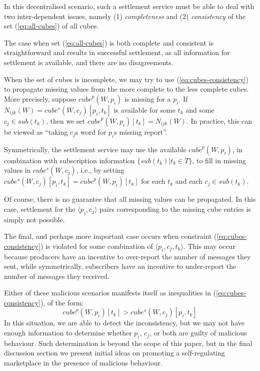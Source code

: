 \documentclass[chi_draft]{sigchi}
\begin{document}
In this decentralised scenario, such a settlement service must be able to deal with two inter-dependent issues, namely (1) \textit{completeness} and (2) \textit{consistency} of the set (\ref{eq:all-cubes}) of all cubes.

The case when set (\ref{eq:all-cubes}) is both complete and consistent is straightforward and results in successful settlement, as all information for settlement is available, and there are no disagreements.

When the set of cubes is incomplete, we may try to use (\ref{eq:cubes-consistency}) to propagate missing values from the more complete to the less complete cubes. 
More precisely, suppose $ \mathit{cube}^p(W, p_i) $ is missing for a $p_i$.
If $ N_{ijk}(W) = \mathit{cube^s}(W, c_j)[p_i, t_k] $ is available for some $t_k$ and some $ c_j \in \mathit{sub}(t_k) $, then we set $  \mathit{cube}^p(W, p_i)[t_k]=  N_{ijk}(W) $.
In practice, this can be viewed as ``taking $ c_j $s word for $p_i$s missing report''.

Symmetrically, the settlement service may use the available $ \mathit{cube}^p(W, p_i)$, in combination with subscription information $ \{\mathit{sub}(t_k) | t_k \in T \}$, to fill in missing values in 
$  \mathit{cube^s}(W, c_j)  $, i.e., by setting 
$ \mathit{cube^s}(W, c_j)[p_i, t_k]  =  \mathit{cube}^p(W, p_i)[t_k]$ for each $t_k$ and each $c_j \in \mathit{sub}(t_k)$.

Of course, there is no guarantee that all missing values can be propagated. 
In this case, settlement for the $\langle p_i, c_j \rangle$ pairs corresponding to the missing cube entries is simply not possible.

The final, and perhaps more important case occurs when constraint (\ref{eq:cubes-consistency}) is violated for some combination of $\langle p_i, c_j, t_k \rangle$.
This may occur because producers have an incentive to over-report the number of messages they sent, while symmetrically, subscribers have an incentive to under-report the number of messages they received.

Either of these malicious scenarios manifests itself as inequalities in (\ref{eq:cubes-consistency}), of the form:
\begin{equation}\label{eq:inconsistencies}
\mathit{cube}^p(W, p_i)[t_k] > \mathit{cube^s}(W, c_j)[p_i, t_k]
\end{equation}
In this situation, we are able to detect the inconsistency, but we may not have enough information to determine whether $p_i$, $c_j$, or both are guilty of malicious behaviour.
Such determination is beyond the scope of this paper, but in the final discussion section we present initial ideas on promoting a self-regulating marketplace in the presence of malicious behaviour.
\end{document}
